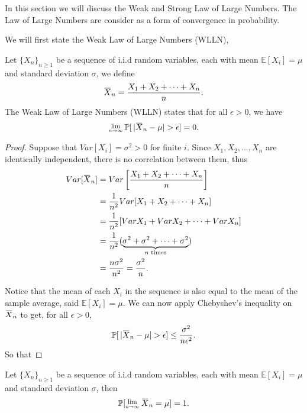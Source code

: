 In this section we will discuss the Weak and Strong Law of Large Numbers. The Law of Large 
Numbers are consider as a form of convergence in probability.

We will first state the Weak Law of Large Numbers (WLLN),

\begin{theorem}
    Let $\{X_n\}_{n \geq 1}$ be a sequence of i.i.d random variables, each with mean 
    $\mathbb{E}[X_i] = \mu$ and standard deviation $\sigma$, we define 
    \[
        \ols{X}_n = \frac{X_1 + X_2 + \cdots + X_n}{n}.
    \]
    The Weak Law of Large Numbers (WLLN) states that for all $\epsilon > 0$, we have 
    \begin{equation}
        \Lim{n \to \infty} \mathbb{P}[\, |\ols{X}_n - \mu| > \epsilon] = 0.
    \end{equation}
\end{theorem}

\begin{proof}
    Suppose that $Var[X_i] = \sigma^2 > 0$ for finite $i$. Since 
    $X_1, X_2, \ldots, X_n$ are identically independent, there is no 
    correlation between them, thus
    \begin{align*}
        Var[\ols{X}_n] &= Var \left[ \frac{X_1 + X_2 + \cdots + X_n}{n} \right]\\
        &= \frac{1}{n^2} Var[X_1 + X_2 + \cdots + X_n]\\
        &= \frac{1}{n^2} [Var X_1 + Var X_2 + \cdots + Var X_n]\\
        &= \frac{1}{n^2} (\underbrace{\sigma^2 + \sigma^2 + \cdots + \sigma^2}_{n \text{ times}})\\
        &= \frac{n\sigma^2}{n^2}
        = \frac{\sigma^2}{n}.
    \end{align*}

    Notice that the mean of each $X_i$ in the sequence is also equal to the mean of the sample average, 
    said $\mathbb{E}[X_i] = \mu$. We can now apply Chebyshev's inequality on $\ols{X}_n$ to get, for all 
    $\epsilon > 0$, 
    \[
        \mathbb{P}[\, |\ols{X}_n - \mu| > \epsilon] \leq \frac{\sigma^2}{n\epsilon^2}.
    \]
    So that 
\end{proof}

\begin{theorem}
    Let $\{X_n\}_{n \geq 1}$ be a sequence of i.i.d random variables, each with mean 
    $\mathbb{E}[X_i] = \mu$ and standard deviation $\sigma$, then 
    \begin{equation}
        \mathbb{P}[\Lim{n \to \infty} \ols{X}_n = \mu] = 1. 
    \end{equation}
\end{theorem}

